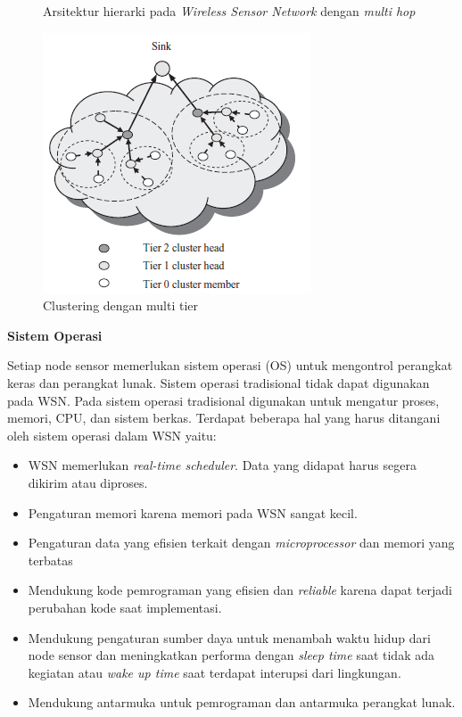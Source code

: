 \documentclass[a4paper,twoside]{article}
\begin{document}
\begin{enumerate}
\begin{itemize}
\begin{figure} [H]
	\caption[Arsitektur hierarki pada \textit{Wireless Sensor Network} dengan \textit{multi hop}]{Arsitektur hierarki pada \textit{Wireless Sensor Network} dengan \textit{multi hop}} 
	\label{fig:cluster_multi} 
\end{figure} 
\begin{figure} [H]
	\centering  
	\includegraphics[scale=0.7]{Gambar/cluster_multitier}  
	\caption[Clsutering dengan multi tier]{Clustering dengan multi tier} 
	\label{fig:cluster_multitier} 
\end{figure}

		\end{itemize}
		
\textbf{Sistem Operasi}
		
		Setiap node sensor memerlukan sistem operasi (OS) untuk mengontrol perangkat keras dan perangkat lunak. Sistem operasi tradisional tidak dapat digunakan pada WSN. Pada sistem operasi tradisional digunakan untuk mengatur proses, memori, CPU, dan sistem berkas. Terdapat beberapa hal yang harus ditangani oleh sistem operasi dalam WSN yaitu:
\begin{itemize}
	\item WSN memerlukan \textit{real-time scheduler}. Data yang didapat harus segera dikirim atau diproses.
	\item Pengaturan memori karena memori pada WSN sangat kecil.
	\item Pengaturan data yang efisien terkait dengan \textit{microprocessor} dan memori yang terbatas
	\item Mendukung kode pemrograman yang efisien dan \textit{reliable} karena dapat terjadi perubahan kode saat implementasi.
	\item Mendukung pengaturan sumber daya untuk menambah waktu hidup dari node sensor dan meningkatkan performa dengan \textit{sleep time} saat tidak ada kegiatan atau \textit{wake up time} saat terdapat interupsi dari lingkungan.
	\item Mendukung antarmuka untuk pemrograman dan antarmuka perangkat lunak. 
\end{itemize}


\end{enumerate}
\end{document}
